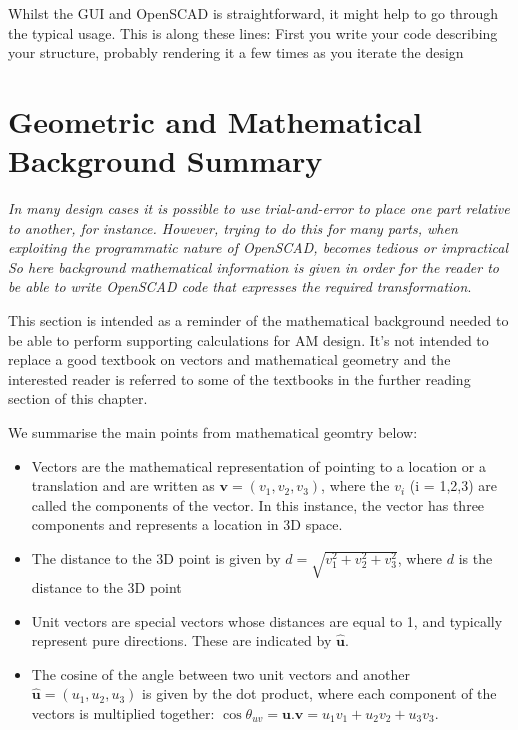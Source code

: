 Whilst the GUI and OpenSCAD is straightforward, it might help to go through the typical usage. This is along these lines: First you write your code describing your structure, probably rendering it a few times as you iterate the design


\section{Geometric and Mathematical Background Summary}
\label{sn:mathematical}

\emph{In many design cases it is possible to use trial-and-error to place one part relative to another, for instance. However, trying to do this for many parts, when exploiting the programmatic nature of OpenSCAD, becomes tedious or impractical So here background mathematical information is given in order for the reader to be able to write OpenSCAD code that expresses the required transformation}. 

This section is intended as a reminder of the mathematical background needed to be able to perform supporting calculations for AM design. It's not intended to replace a good textbook on vectors and mathematical geometry and the interested reader is referred to some of the textbooks in the further reading section of this chapter. 

We summarise the main points from mathematical geomtry below: 

\begin{itemize} 
\item Vectors are the mathematical representation of pointing to a location or a translation and are written as $\textbf{v} = \left( v_{1}, v_{2}, v_{3} \right)$, where the $v_{i}$ (i = 1,2,3) are called the components of the vector. In this instance, the vector has three components and represents a location in 3D space.
\item The distance to the 3D point is given by $d = \sqrt{ v_{1}^{2} + v_{2}^{2} + v_{3}^{2} }$, where $d$ is the distance to the 3D point
\item Unit vectors are special vectors whose distances are equal to 1, and typically represent pure directions. These are indicated by $\hat{\textbf{u}}$. 
\item The cosine of the angle between two unit vectors and another $\hat{\textbf{u}} = \left( u_{1}, u_{2}, u_{3} \right)$ is given by the dot product, where each component of the vectors is multiplied together:  $ \cos \theta_{uv} = \textbf{u}.\textbf{v} = u_{1}v_{1} + u_{2}v_{2} + u_{3}v_{3}$. 
\end{itemize}


